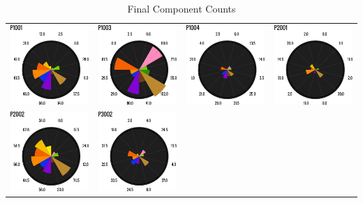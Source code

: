 \begin{table}[htbp]
\small
  \centering
  \caption{Final Component Counts}
    \begin{tabular}{p{1.25in}p{1.25in}p{1.25in}p{1.25in}}
    \toprule
\includegraphics[width=1.25in]{./images/cont4/polar_charts/p1001}&
\includegraphics[width=1.25in]{./images/cont4/polar_charts/p1003}&
\includegraphics[width=1.25in]{./images/cont4/polar_charts/p1004}&
\includegraphics[width=1.25in]{./images/cont4/polar_charts/p2001}\\
\includegraphics[width=1.25in]{./images/cont4/polar_charts/p2002}&
\includegraphics[width=1.25in]{./images/cont4/polar_charts/p3002}&

\end{tabular}
\end{table}
